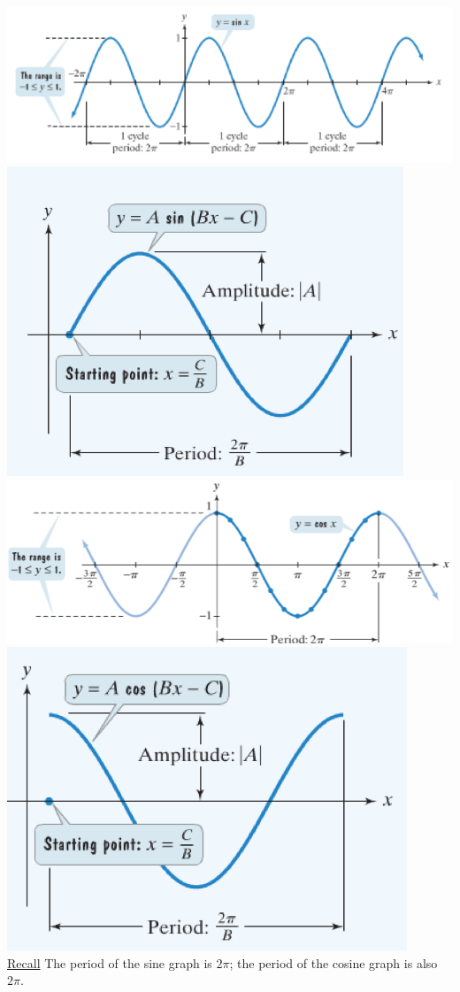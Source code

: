 \includegraphics{sine1}\includegraphics[scale=0.7]{sine2}\\
\includegraphics{cosine1}\includegraphics[scale=0.7]{cosine2}\\
\noindent \underline{Recall} The period of the sine graph is $2\pi$; the period of the cosine graph is also $2\pi$. 


